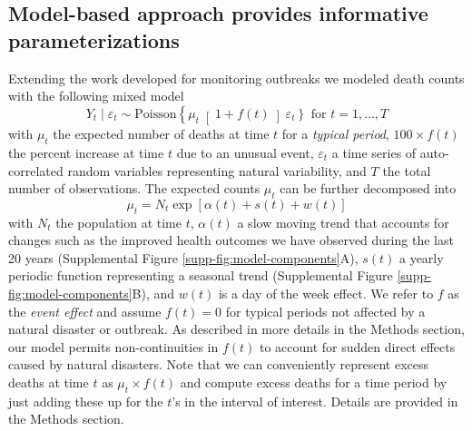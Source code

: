 \documentclass[11pt]{article}
\begin{document}
\subsection{Model-based approach provides informative parameterizations}
\label{subsec:model-based}
Extending the work developed for monitoring outbreaks \cite{farrington1996statistical,hohle2008count,noufaily2013improved,salmon2016monitoring} we modeled death counts with the following mixed model
\begin{equation}
    Y_t \mid \varepsilon_t \sim 
    \mbox{Poisson}\left\{ \mu_t \right[1 + f(t) \left]  \varepsilon_t \right\} \mbox{ for } t = 1, \dots,T
\end{equation}
with $\mu_t$ the expected number of deaths at time $t$ for a \emph{typical period}, $100 \times f(t)$ the percent increase at time $t$ due to an unusual event, $\varepsilon_t$ a time series of auto-correlated random variables representing natural variability, and $T$ the total number of observations. The expected counts $\mu_t$ can be further decomposed into 
\begin{equation}
    \mu_t =N_t \exp[\alpha(t) + s(t) + w(t)]
    \label{eq:mean-model}
\end{equation}
with $N_t$ the population at time $t$, $\alpha(t)$ a slow moving trend that accounts for changes such as the improved health outcomes we have observed during the last 20 years (Supplemental Figure \ref{supp-fig:model-components}A), $s(t)$ a yearly periodic function representing a seasonal trend (Supplemental Figure \ref{supp-fig:model-components}B), and $w(t)$ is a day of the week effect. We refer to $f$ as the \emph{event effect} and assume $f(t) = 0$ for typical periods not affected by a natural disaster or outbreak. As described in more details in the Methods section, our model permits non-continuities in $f(t)$ to account for sudden direct effects caused by natural disasters. Note that we can conveniently represent excess deaths at time $t$ as $\mu_t \times f(t)$ and compute excess deaths for a time period by just adding these up for the $t$'s in the interval of interest. 
Details are provided in the Methods section.
\end{document}
